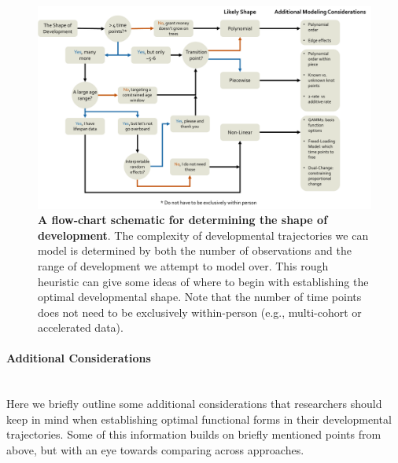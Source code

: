 \documentclass[11pt]{article}
\newcommand{\subsubsubsection}[1]{\paragraph{#1}\mbox{}\\}  %
\begin{document}
\begin{figure}[H]
    \centering
    \includegraphics[width = 1\textwidth]{figures/Figure 2.pdf}
    \caption{\textbf{A flow-chart schematic for determining the shape of development}. The complexity of developmental trajectories we can model is determined by both the number of observations and the range of development we attempt to model over. This rough heuristic can give some ideas of where to begin with establishing the optimal developmental shape. Note that the number of time points does not need to be exclusively within-person (e.g., multi-cohort or accelerated data).}
    \label{fig:shapeFig}
\end{figure}


\subsubsubsection{Additional Considerations}
Here we briefly outline some additional considerations that researchers should keep in mind when establishing optimal functional forms in their developmental trajectories. Some of this information builds on briefly mentioned points from above, but with an eye towards comparing across approaches.
\end{document}
